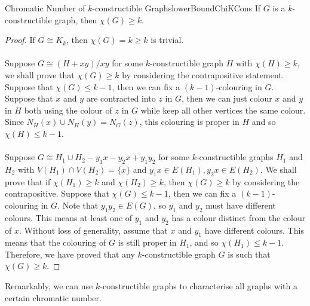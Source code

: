\documentclass[math, code]{amznotes}
\theoremstyle{remark}
\begin{document}
\begin{probox}{Chromatic Number of $k$-constructible Graphs}{lowerBoundChiKCons}
    If $G$ is a $k$-constructible graph, then $\chi(G) \geq k$.
    \tcblower
    \begin{proof}
        If $G \cong K_k$, then $\chi(G) = k \geq k$ is trivial. 
        \\\\
        Suppose $G \cong (H + xy)/xy$ for some $k$-constructible graph $H$ with $\chi(H) \geq k$, we shall prove that $\chi(G) \geq k$ by considering the contrapositive statement. Suppose that $\chi(G) \leq k - 1$, then we can fix a $(k - 1)$-colouring in $G$. Suppose that $x$ and $y$ are contracted into $z$ in $G$, then we can just colour $x$ and $y$ in $H$ both using the colour of $z$ in $G$ while keep all other vertices the same colour. Since $N_H(x) \cup N_H(y) = N_G(z)$, this colouring is proper in $H$ and so $\chi(H) \leq k - 1$. 
        \\\\
        Suppose $G \cong H_1 \cup H_2 - y_1x - y_2x + y_1y_2$ for some $k$-constructible graphs $H_1$ and $H_2$ with $V(H_1) \cap V(H_2) = \{x\}$ and $y_1x \in E(H_1), y_2x \in E(H_2)$. We shall prove that if $\chi(H_1) \geq k$ and $\chi(H_2) \geq k$, then $\chi(G) \geq k$ by considering the contrapositive. Suppose that $\chi(G) \leq k - 1$, then we can fix a $(k - 1)$-colouring in $G$. Note that $y_1y_2 \in E(G)$, so $y_1$ and $y_2$ must have different colours. This means at least one of $y_1$ and $y_2$ has a colour distinct from the colour of $x$. Without loss of generality, assume that $x$ and $y_1$ have different colours. This means that the colouring of $G$ is still proper in $H_1$, and so $\chi(H_1) \leq k - 1$. Therefore, we have proved that any $k$-constructible graph $G$ is such that $\chi(G) \geq k$.
    \end{proof}
\end{probox}
Remarkably, we can use $k$-constructible graphs to characterise all graphs with a certain chromatic number.
\end{document}
